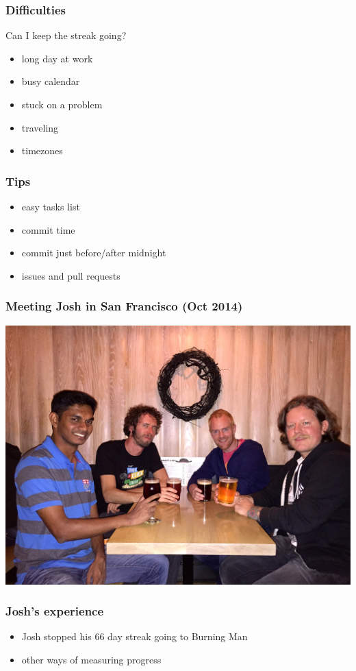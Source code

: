 \documentclass[14pt]{beamer}
\begin{document}
  \begin{frame}
    \frametitle{Difficulties}
    Can I keep the streak going?
    \begin{itemize}
      \item long day at work
      \item busy calendar
      \item stuck on a problem
      \item traveling
      \item timezones
    \end{itemize}
  \end{frame}
  \begin{frame}
    \frametitle{Tips}
    \begin{itemize}
      \item easy tasks list
      \item commit time
      \item commit just before/after midnight
      \item issues and pull requests
    \end{itemize}
  \end{frame}
  \begin{frame}
    \frametitle{Meeting Josh in San Francisco (Oct 2014)}
    \includegraphics[scale=.1]{josh_justin.jpg}
  \end{frame}
  \begin{frame}
    \frametitle{Josh's experience}
    \begin{itemize}
      \item Josh stopped his 66 day streak going to Burning Man
      \item other ways of measuring progress
    \end{itemize}
  \end{frame}
\end{document}
